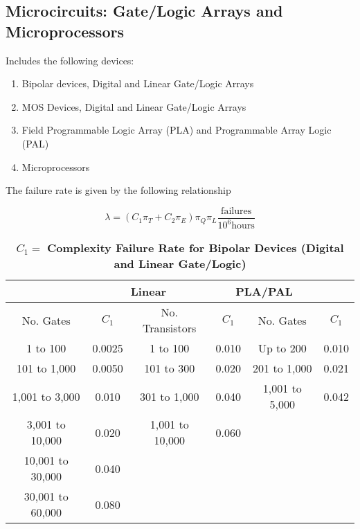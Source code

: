 \newpage

\subsection{Microcircuits: Gate/Logic Arrays and Microprocessors}
\label{subsection:microcircuits-gatelogic-arrays-and-microprocessors}

Includes the following devices:

\begin{enumerate}
\def\labelenumi{\arabic{enumi}.}
\item  Bipolar devices, Digital and Linear Gate/Logic Arrays
\item  MOS Devices, Digital and Linear Gate/Logic Arrays
\item  Field Programmable Logic Array (PLA) and Programmable Array Logic (PAL)
\item  Microprocessors
\end{enumerate}

The failure rate is given by the following relationship

$$\lambda = (C_{1}\pi_{T} + C_{2}\pi_{E}) \pi_{Q} \pi_{L} \frac{\text{failures}}{10^6 \text{hours}}$$



\begin{table}[h]
\caption{ $C_{1} = $ \textbf{Complexity Failure Rate for Bipolar Devices (Digital and Linear Gate/Logic)}}
\label{table:complexFailureRateBjt}
\begin{tabular}{|c|c|c|c|c|c|} \hline
\rowcolor{Gray}
\multicolumn{2}{|c|}{\textbf{Digital}} 	& \multicolumn{2}{|c|}{\textbf{Linear}} & \multicolumn{2}{|c|}{\textbf{PLA/PAL}} \\ \hline
\rowcolor{Gray}
No. Gates & $C_{1}$ & No. Transistors &$C_{1}$ & No. Gates & $C_{1}$ \\ \hline
1 to 100 			& 0.0025 			& 1 to 100 				& 0.010 		& Up to 200 		& 0.010 		\\ \hline
101 to 1,000		& 0.0050 			& 101 to 300 			& 0.020 		& 201 to 1,000 		& 0.021 		\\ \hline
1,001 to 3,000		& 0.010				& 301 to 1,000 		& 0.040 		& 1,001 to 5,000 	& 0.042 		\\ \hline
3,001 to 10,000 	& 0.020 				& 1,001 to 10,000 	& 0.060 		& 					&			\\ \hline
10,001 to 30,000	& 0.040 				& 					& 				&					&		\\ \hline
30,001 to 60,000	& 0.080 				& 					& 				&					&		\\ \hline
\end{tabular}
\end{table}





